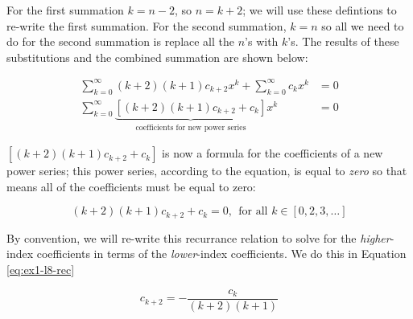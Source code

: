 \noindent For the first summation $k=n-2$, so $n=k+2$; we will use these defintions to re-write the first summation.  For the second summation, $k=n$ so all we need to do for the second summation is replace all the $n$'s with $k$'s.  The results of these substitutions and the combined summation are shown below:

\begin{align*}
\sum\limits_{k=0}^{\infty} (k+2)(k+1)c_{k+2}x^k + \sum\limits_{k=0}^{\infty} c_k x^k &= 0 \\
\sum\limits_{k=0}^{\infty}\underbrace{\left[(k+2)(k+1)c_{k+2} + c_k \right]}_{\text{coefficients for new power series}}x^k&=0
\end{align*}

 $\left[(k+2)(k+1)c_{k+2}+c_k \right]$ is now a formula for the coefficients of a new power series; this power series, according to the equation, is equal to \emph{zero} so that means all of the coefficients must be equal to zero:

\begin{equation*}
(k+2)(k+1)c_{k+2} + c_{k} = 0, \ \ \text{for all } k \in [0,2,3,\dots]
\end{equation*} 


By convention, we will re-write this recurrance relation to solve for the \emph{higher}-index coefficients in terms of the \emph{lower}-index coefficients.  We do this in Equation \ref{eq:ex1-l8-rec}

\begin{equation}
c_{k+2}=-\frac{c_k}{(k+2)(k+1)}
\label{eq:ex1-l8-rec}
\end{equation}

